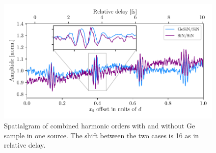 \begin{figure}
	\centering
	\includegraphics[width=1.0\textwidth]{figures/refractive_index/cross_correlation_ge.pdf}
	\caption[Spatialgram of combined harmonic orders with and without Ge sample in one source]{Spatialgram of combined harmonic orders with and without Ge sample in one source. The shift between the two cases is 16 as in relative delay.}
	\label{fig:interferogram_ge}
\end{figure}

